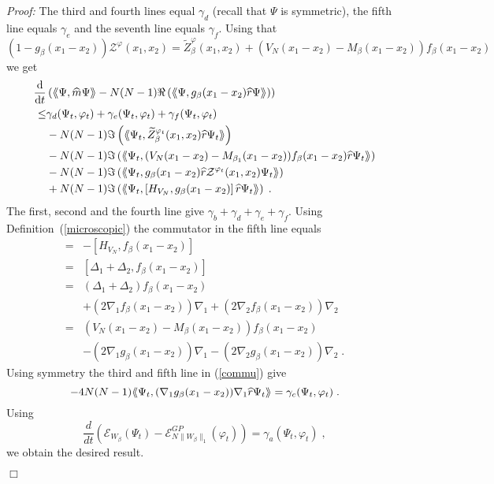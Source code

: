 \documentclass[11pt, english, american]{article}
\newcommand{\bet}{\beta_1}
\newcommand{\laa}{\langle\hspace{-0.08cm}\langle}
\newcommand{\raa}{\rangle\hspace{-0.08cm}\rangle}
\newcommand{\dt}{\frac{\text{d}}{\text{d}t}}
\newenvironment{proof}{\emph{Proof:}}{\begin{flushright} $ \Box $ \end{flushright}}
\renewcommand{\phi}{\varphi}
\newcommand{\potdiffneu}{\widetilde{Z}_{\beta}}
\begin{document}
\begin{proof}
The third and fourth lines equal $\gamma_d$ (recall that $\Psi$ is symmetric), the fifth line equals  $\gamma_e$ and the seventh line equals $\gamma_f$.
Using that $(1-g_{\beta}(x_{1}-x_{2}))\mathcal{Z}^\phi(x_1,x_2)=\potdiffneu^\phi(x_1,x_2)+(V_{N}(x_1-x_2)-M_{\beta}(x_1-x_2))f_{\beta}(x_{1}-x_{2})$
we get
\begin{align}\label{commu}
\dt &
\left(
\laa \Psi, \widehat{m} \Psi \raa
%
-N(N-1)\Re\left(\laa\Psi
, g_{\beta}(x_{1}-x_{2}) \widehat{r}
\Psi\raa\right)
\right)
\nonumber
\\
\leq &\gamma_d(\Psi_t,\phi_t)+\gamma_e(\Psi_t,\phi_t)+\gamma_f(\Psi_t,\phi_t)
\nonumber
%
\\
&-N(N-1)\Im\left(\laa\Psi_t ,\potdiffneu^{\phi_t}(x_1,x_2) \widehat{r}
\Psi_t\raa\right)
%
\\\nonumber&-N(N-1)\Im\left(\laa\Psi_t ,
(V_{N}(x_1-x_2)-M_{\bet}(x_1-x_2))f_{\beta}(x_1-x_2)\widehat{r}
\Psi_t\raa\right)
%
\\\nonumber&-N(N-1)\Im\left(\laa\Psi_t ,g_{\beta}(x_{1}-x_{2})
\widehat{r}\mathcal{Z}^{\phi_t}(x_1,x_2) \Psi_t\raa\right)
%
\\\nonumber&+N(N-1)\Im\left(\laa\Psi_t ,\left[H_{V_N},
g_{\beta}(x_{1}-x_{2})
\right]\widehat{r}
\Psi_t\raa\right)\;.
%
%
\end{align}
The first, second and the fourth line give $\gamma_b+\gamma_d+\gamma_e+ \gamma_f$. Using Definition~(\ref{microscopic}) the commutator in the fifth line equals
\begin{align*}[H_{V_N},g_{\beta}(x_1-x_2)]=&-[H_{V_N},f_{\beta}(x_1-x_2)]\\\nonumber=&[\Delta_1+\Delta_2,f_{\beta}(x_1-x_2)]
%
\\\nonumber=&(\Delta_1+\Delta_2)f_{\beta}(x_1-x_2)\\\nonumber&+(2\nabla_1f_{\beta}(x_1-x_2))\nabla_1+(2\nabla_2f_{\beta}(x_1-x_2))\nabla_2
%
\\\nonumber=&(V_{N}(x_1-x_2)-M_{\beta}(x_1-x_2))f_{\beta}(x_1-x_2)\\\nonumber&-(2\nabla_1g_{\beta}(x_1-x_2))\nabla_1-(2\nabla_2g_{\beta}(x_1-x_2))\nabla_2\;.
%
\end{align*}
Using symmetry the third and fifth line in (\ref{commu}) give
$$-4N(N-1)\laa\Psi_t
, (\nabla_1g_{\beta}(x_1-x_2))\nabla_1
\widehat{r}\Psi_t\raa=\gamma_c (\Psi_t,\phi_t)\;.$$
Using 
$$
\frac{d}{dt}\left(\mathcal{E}_{W_\beta}(\Psi_t)-\mathcal{E}_{N \|W_\beta\|_1}^{GP}(\phi_t)\right)
=
\gamma_a (\Psi_t, \phi_t)
\;,
$$
we obtain the desired result.
\end{proof}
\end{document}
